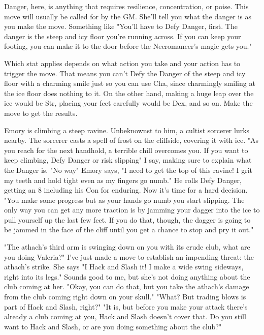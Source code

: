        

Danger, here, is anything that requires resilience, concentration, or poise. This move will usually be called for by the GM. She'll tell you what the danger is as you make the move. Something like "You'll have to Defy Danger, first. The danger is the steep and icy floor you're running across. If you can keep your footing, you can make it to the door before the Necromancer's magic gets you."

       

Which stat applies depends on what action you take and your action has to trigger the move. That means you can't Defy the Danger of the steep and icy floor with a charming smile just so you can use Cha, since charmingly smiling at the ice floor does nothing to it. On the other hand, making a huge leap over the ice would be Str, placing your feet carefully would be Dex, and so on. Make the move to get the results.

       
\startExample
Emory is climbing a steep ravine. Unbeknownst to him, a cultist sorcerer lurks nearby. The sorcerer casts a spell of frost on the cliffside, covering it with ice. "As you reach for the next handhold, a terrible chill overcomes you. If you want to keep climbing, Defy Danger or risk slipping" I say, making sure to explain what the Danger is. "No way" Emory says, "I need to get the top of this ravine! I grit my teeth and hold tight even as my fingers go numb." He rolls Defy Danger, getting an 8 including his Con for enduring. Now it's time for a hard decision. "You make some progress but as your hands go numb you start slipping. The only way you can get any more traction is by jamming your dagger into the ice to pull yourself up the last few feet. If you do that, though, the dagger is going to be jammed in the face of the cliff until you get a chance to stop and pry it out."
\stopExample
       
\startExample
"The athach's third arm is swinging down on you with its crude club, what are you doing Valeria?" I've just made a move to establish an impending threat: the athach's strike. She says "I Hack and Slash it! I make a wide swing sideways, right into its legs." Sounds good to me, but she's not doing anything about the club coming at her. "Okay, you can do that, but you take the athach's damage from the club coming right down on your skull." "What? But trading blows is part of Hack and Slash, right?" "It is, but before you make your attack there's already a club coming at you, Hack and Slash doesn't cover that. Do you still want to Hack and Slash, or are you doing something about the club?"
\stopExample
       
